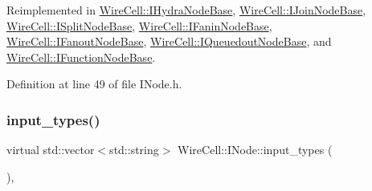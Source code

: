 Reimplemented in \hyperlink{class_wire_cell_1_1_i_hydra_node_base_a6bcaeb0a80fa720c3180d9b9d8b9fd22}{Wire\+Cell\+::\+I\+Hydra\+Node\+Base}, \hyperlink{class_wire_cell_1_1_i_join_node_base_a03ae350e6d99bff19fc4e01c9e3d7f6d}{Wire\+Cell\+::\+I\+Join\+Node\+Base}, \hyperlink{class_wire_cell_1_1_i_split_node_base_a001e95f0334b6f626049a7d50f6cf55f}{Wire\+Cell\+::\+I\+Split\+Node\+Base}, \hyperlink{class_wire_cell_1_1_i_fanin_node_base_af0f007d93e510830bccbc186c6642749}{Wire\+Cell\+::\+I\+Fanin\+Node\+Base}, \hyperlink{class_wire_cell_1_1_i_fanout_node_base_abda7275bd1a34eab0dfffa8dc29f3b61}{Wire\+Cell\+::\+I\+Fanout\+Node\+Base}, \hyperlink{class_wire_cell_1_1_i_queuedout_node_base_aac268591658fea147722dccd6cb5e3a2}{Wire\+Cell\+::\+I\+Queuedout\+Node\+Base}, and \hyperlink{class_wire_cell_1_1_i_function_node_base_a19383abea731c6cbafc88fb9ffe11ee9}{Wire\+Cell\+::\+I\+Function\+Node\+Base}.



Definition at line 49 of file I\+Node.\+h.

\mbox{\label{class_wire_cell_1_1_i_node_ae13fc140c8e815fac9327dfa5b43f853}} 
\subsubsection{\texorpdfstring{input\+\_\+types()}{input\_types()}}
{\footnotesize\ttfamily virtual std\+::vector$<$std\+::string$>$ Wire\+Cell\+::\+I\+Node\+::input\+\_\+types (\begin{DoxyParamCaption}{ }\end{DoxyParamCaption})\hspace{0.3cm}{\ttfamily [inline]}, {\ttfamily [virtual]}}



